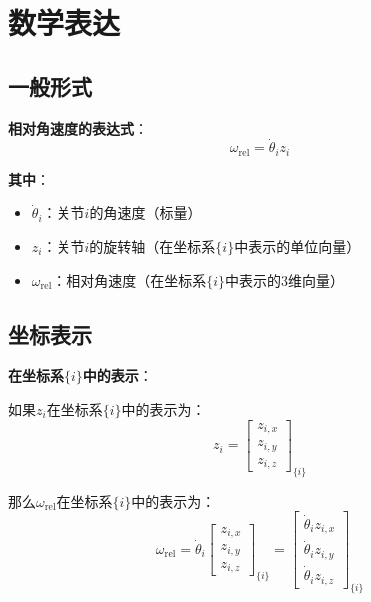 \documentclass[12pt,a4paper]{article}
\begin{document}
\section{数学表达}

\subsection{一般形式}

\textbf{相对角速度的表达式}：
\begin{equation}
\omega_{\text{rel}} = \dot{\theta}_i z_i
\end{equation}

\textbf{其中}：
\begin{itemize}
\item $\dot{\theta}_i$：关节$i$的角速度（标量）
\item $z_i$：关节$i$的旋转轴（在坐标系$\{i\}$中表示的单位向量）
\item $\omega_{\text{rel}}$：相对角速度（在坐标系$\{i\}$中表示的3维向量）
\end{itemize}

\subsection{坐标表示}

\textbf{在坐标系$\{i\}$中的表示}：

如果$z_i$在坐标系$\{i\}$中的表示为：
\begin{equation}
z_i = \begin{bmatrix} z_{i,x} \\ z_{i,y} \\ z_{i,z} \end{bmatrix}_{\{i\}}
\end{equation}

那么$\omega_{\text{rel}}$在坐标系$\{i\}$中的表示为：
\begin{equation}
\omega_{\text{rel}} = \dot{\theta}_i \begin{bmatrix} z_{i,x} \\ z_{i,y} \\ z_{i,z} \end{bmatrix}_{\{i\}} = \begin{bmatrix} \dot{\theta}_i z_{i,x} \\ \dot{\theta}_i z_{i,y} \\ \dot{\theta}_i z_{i,z} \end{bmatrix}_{\{i\}}
\end{equation}
\end{document}
